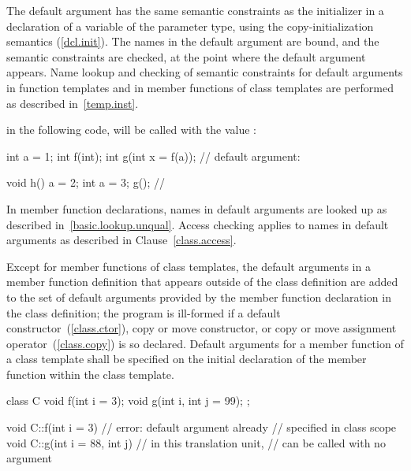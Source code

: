 \pnum
{}%
%
%
The default argument has the
same semantic constraints as the initializer in a
declaration of a variable of the parameter type, using the
copy-initialization semantics (\ref{dcl.init}).
The names in the
default argument are bound, and the semantic constraints are checked,
at the point where the default argument appears.
Name lookup and checking of semantic constraints for default
arguments in function templates and in member functions of
class templates are performed as described in~\ref{temp.inst}.
\begin{example}
in the following code,
%
will be called with the value
:

\begin{codeblock}
int a = 1;
int f(int);
int g(int x = f(a));            // default argument: 

void h() {
  a = 2;
  {
  int a = 3;
  g();                          // 
  }
}
\end{codeblock}
\end{example}
\begin{note}
In member function declarations,
names in default arguments are looked up
as described in~\ref{basic.lookup.unqual}.
Access checking applies to names in default arguments as
described in Clause~\ref{class.access}.
\end{note}

\pnum
Except for member functions of class templates, the
default arguments in a member function definition that appears
outside of the class definition
are added to the set of default arguments provided by the
member function declaration in the class definition;
the program is ill-formed if a default constructor~(\ref{class.ctor}),
copy or move constructor, or copy or move assignment operator~(\ref{class.copy})
is so declared.
Default arguments for a member function of a class template
shall be specified on the initial declaration of the member
function within the class template.
\begin{example}

\begin{codeblock}
class C {
  void f(int i = 3);
  void g(int i, int j = 99);
};

void C::f(int i = 3) {          // error: default argument already
}                               // specified in class scope
void C::g(int i = 88, int j) {  // in this translation unit,
}                               //  can be called with no argument
\end{codeblock}
\end{example}

